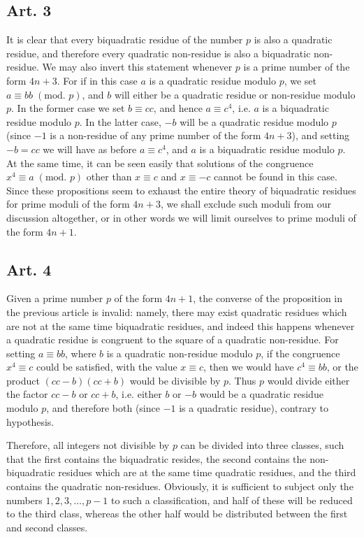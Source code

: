 \documentclass{book}
\theoremstyle{plain}
\theoremstyle{remark}
\begin{document}
\subsection*{Art. 3}

It is clear that every biquadratic residue of the number $p$ is also a quadratic residue, and therefore every quadratic non-residue is also a biquadratic non-residue.  We may also invert this statement whenever $p$ is a prime number of the form $4n+3$.  For if in this case $a$ is a quadratic residue modulo $p$, we set $a \equiv bb \; (\textrm{mod. }p)$, and $b$ will either be a quadratic residue or non-residue modulo $p$.  In the former case we set $b \equiv cc$, and hence $a \equiv c^4$, i.e. $a$ is a biquadratic residue modulo $p$.  In the latter case, $-b$ will be a quadratic residue modulo $p$ (since $-1$ is a non-residue of any prime number of the form $4n+3$), and setting $-b = cc$ we will have as before $a \equiv c^4$, and $a$ is a biquadratic residue modulo $p$. At the same time, it can be seen easily that solutions of the congruence $x^4 \equiv a \;(\textrm{mod. }p)$ other than $x \equiv c$ and $x \equiv -c$ cannot be found in this case.  Since these propositions seem to exhaust the entire theory of biquadratic residues for prime moduli of the form $4n+3$, we shall exclude such moduli from our discussion altogether, or in other words we will limit ourselves to prime moduli of the form $4n+1$. 

\subsection*{Art. 4} 

Given a prime number $p$ of the form $4n+1$, the converse of the proposition in the previous article is invalid: namely, there may exist quadratic residues which are not at the same time biquadratic residues, and indeed this happens whenever a quadratic residue is congruent to the square of a quadratic non-residue.  For setting $a \equiv bb$, where $b$ is a quadratic non-residue modulo $p$, if the congruence $x^4 \equiv c$ could be satisfied, with the value $x \equiv c$, then we would have $c^4 \equiv bb$, or the product $(cc-b)(cc+b)$ would be divisible by $p$.  Thus $p$ would divide either the factor $cc-b$ or $cc+b$, i.e. either $b$ or $-b$ would be a quadratic residue modulo $p$, and therefore both (since $-1$ is a quadratic residue), contrary to hypothesis. 

Therefore, all integers not divisible by $p$ can be divided into three classes, such that the first contains the biquadratic resides, the second contains the non-biquadratic residues which are at the same time quadratic residues, and the third contains the quadratic non-residues.  Obviously, it is sufficient to subject only the numbers $1, 2, 3, \dots, p-1$ to such a classification, and half of these will be reduced to the third class, whereas the other half would be distributed between the first and second classes.
\end{document}
